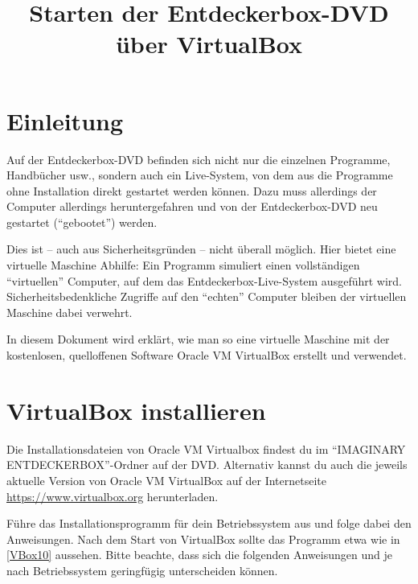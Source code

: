 \documentclass[a4paper,10pt,BCOR=0mm,DIV=14]{scrartcl}
\title{Starten der Entdeckerbox-DVD über VirtualBox}
\newcommand{\command}[1]{\textsf{\enquote{#1}}}
\begin{document}
\maketitle

\section{Einleitung}
Auf der Entdeckerbox-DVD befinden sich nicht nur die einzelnen Programme, Handbücher usw., sondern auch ein Live-System, von dem aus die Programme ohne Installation direkt gestartet werden können. Dazu muss allerdings der Computer allerdings heruntergefahren und von der Entdeckerbox-DVD neu gestartet (\enquote{gebootet}) werden.

Dies ist -- auch aus Sicherheitsgründen -- nicht überall möglich. Hier bietet eine virtuelle Maschine Abhilfe: Ein Programm simuliert einen vollständigen \enquote{virtuellen} Computer, auf dem das Entdeckerbox-Live-System ausgeführt wird. Sicherheitsbedenkliche Zugriffe auf den \enquote{echten} Computer bleiben der virtuellen Maschine dabei verwehrt.

In diesem Dokument wird erklärt, wie man so eine virtuelle Maschine mit der kostenlosen, quelloffenen Software Oracle VM VirtualBox erstellt und verwendet.



\section{VirtualBox installieren}
Die Installationsdateien von Oracle VM Virtualbox findest du im \command{IMAGINARY ENTDECKERBOX}-Ordner auf der DVD. Alternativ kannst du auch die jeweils aktuelle Version von Oracle VM VirtualBox auf der Internetseite \url{https://www.virtualbox.org} herunterladen.

Führe das Installationsprogramm für dein Betriebssystem aus und folge dabei den Anweisungen. Nach dem Start von VirtualBox sollte das Programm etwa wie in \cref{VBox10} aussehen. Bitte beachte, dass sich die folgenden Anweisungen und  je nach Betriebssystem geringfügig unterscheiden können.
\end{document}
